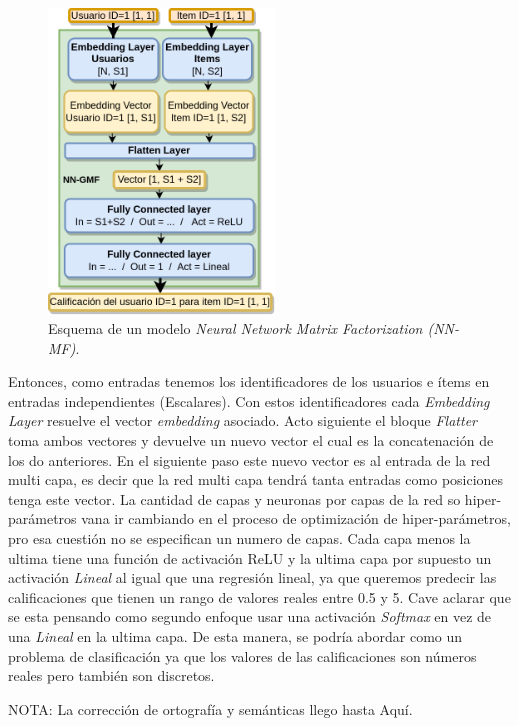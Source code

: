 \documentclass[11pt,a4paper,twoside]{thesis}
\begin{document}
\begin{figure}[h!]
	\centering
	\includegraphics[width=6cm]{./images/NN-MF.png}

	\caption{
		Esquema de un modelo \textit{Neural Network Matrix Factorization (NN-MF)}.
	}
	\label{fig:NNMFModel}
\end{figure}

Entonces, como entradas tenemos los identificadores de los usuarios e ítems en
entradas independientes (Escalares). Con estos identificadores cada
\textit{Embedding Layer} resuelve el vector \textit{embedding} asociado. Acto
siguiente el bloque \textit{Flatter} toma ambos vectores y devuelve un nuevo
vector el cual es la concatenación de los do anteriores. En el siguiente paso
este nuevo vector es al entrada de la red multi capa, es decir que la red multi
capa tendrá tanta entradas como posiciones tenga este vector. La cantidad de
capas y neuronas por capas de la red so hiper-parámetros vana ir cambiando en
el proceso de optimización de hiper-parámetros, pro esa cuestión no se
especifican un numero de capas. Cada capa menos la ultima tiene una función de
activación ReLU y la ultima capa por supuesto un activación \textit{Lineal} al
igual que una regresión lineal, ya que queremos predecir las calificaciones que
tienen un rango de valores reales entre 0.5 y 5. Cave aclarar que se esta
pensando como segundo enfoque usar una activación \textit{Softmax} en vez de
una \textit{Lineal} en la ultima capa. De esta manera, se podría abordar como
un problema de clasificación ya que los valores de las calificaciones son
números reales pero también son discretos.

\clearpage


NOTA: La corrección de ortografía y semánticas llego hasta Aquí.
\end{document}
